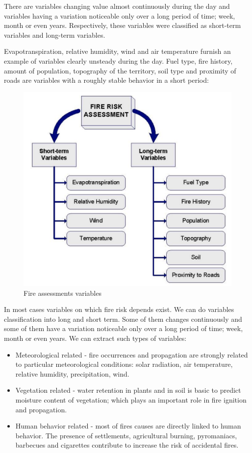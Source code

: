 {{	
	There are variables changing value almost continuously during the day and variables having a variation noticeable only over a long period of time; week, month or even years. Respectively, these variables were classified as short-term variables and long-term variables.
	
	Evapotranspiration, relative humidity, wind and air temperature furnish an example of variables clearly unsteady during the day. Fuel type, fire history, amount of population, topography of the territory, soil type and proximity of roads are variables with a roughly stable behavior in a short period:
	
	\begin{figure}[H]
		\centering
		\includegraphics[width=0.8\linewidth]{images/fire_assesment.png}
		\caption{Fire assessments variables}
		\label{fig:copernicus_hub}
	\end{figure}

	In most cases variables on which fire risk depends exist. We can do variables classification into long and short term. Some of them changes continuously and some of them have a variation noticeable only over a long period of time; week, month or even years. We can extract such types of variables:
	
	\begin{itemize}
		\item Meteorological related - fire occurrences and propagation are strongly related to particular meteorological conditions: solar radiation, air temperature, relative humidity, precipitation, wind.
		\item Vegetation related - water retention in plants and in soil is basic to predict moisture content of vegetation; which plays an important role in fire ignition and propagation.
		\item Human behavior related - most of fires causes are directly linked to human behavior. The presence of settlements, agricultural burning, pyromaniacs, barbecues and cigarettes contribute to increase the risk of accidental fires.
	\end{itemize}

}}
